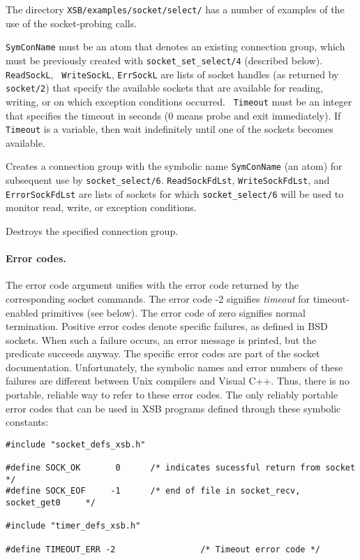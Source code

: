 The directory {\tt XSB/examples/socket/select/} has a number of examples of
the use of the socket-probing calls.
\begin{description}
  {\tt SymConName} must be an atom that
  denotes an existing connection group, which must be previously created with
  {\tt socket\_set\_select/4} (described below). {\tt ReadSockL}, {\tt
    WriteSockL}, {\tt ErrSockL} are lists of socket handles (as returned by
  {\tt socket/2}) that specify the available sockets that are available for
  reading, writing, or on which exception conditions occurred.  {\tt
    Timeout} must be an integer that specifies the timeout in seconds (0
  means probe and exit immediately). If {\tt Timeout} is a variable, then
  wait indefinitely until one of the sockets becomes available.

Creates a connection group with the symbolic name {\tt SymConName}
(an atom) for subsequent use by {\tt socket\_select/6}.
{\tt ReadSockFdLst}, {\tt WriteSockFdLst}, and {\tt ErrorSockFdLst} are
lists of sockets for which {\tt socket\_select/6} will be used to monitor read,
write, or exception conditions.

Destroys the specified connection group.

\end{description}


\paragraph{Error codes.}
The error code argument unifies with the error code returned by the
corresponding socket commands. The error code -2 signifies
\emph{timeout} for timeout-enabled primitives (see below). The error code
of zero signifies normal termination. Positive error codes denote specific
failures, as defined in BSD sockets. When such a failure occurs, an error
message is printed, but the predicate succeeds anyway. The specific error
codes are part of the socket documentation. Unfortunately, the symbolic
names and error numbers of these failures are different between Unix
compilers and Visual C++. Thus, there is no portable, reliable way to refer
to these error codes. The only reliably portable error codes that can be 
used in XSB programs defined through these symbolic constants:
\begin{verbatim}
#include "socket_defs_xsb.h"  

#define SOCK_OK       0      /* indicates sucessful return from socket      */
#define SOCK_EOF     -1      /* end of file in socket_recv, socket_get0     */

#include "timer_defs_xsb.h"

#define TIMEOUT_ERR -2                 /* Timeout error code */
\end{verbatim}

